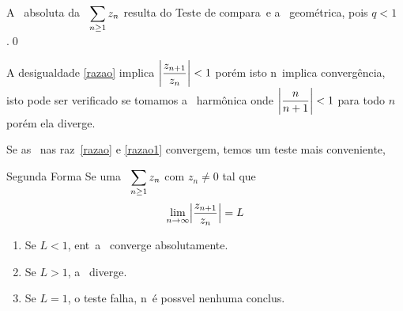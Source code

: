 A \conver\ absoluta da \ser\ $\displaystyle{\sum_{n\geq 1}z_n}$ resulta do
Teste de compara\cao\ e a \ser\ geom\'etrica, pois $q<1$.\qed

\begin{obs}
A desigualdade \eqref{razao} implica
$\displaystyle{\left|\frac{z_{n+1}}{z_n}\right|<1}$ por\'em isto n\ao\
implica converg\^encia, isto pode ser verificado se tomamos a
\ser\ harm\^onica onde $\displaystyle{\left|\frac{n}{n+1}\right|<1}$ para
todo $n$ por\'em ela diverge.
\end{obs}

Se as \seqs\ nas raz\oes\ \eqref{razao} e \eqref{razao1}
convergem, temos um teste mais conveniente,

\begin{theoc}{Segunda Forma}{}
Se uma \ser\ $\displaystyle{\sum_{n\geq 1}z_n}$ com $z_n\neq 0$ tal que
\begin{equation}\label{razao2}
  \lim_{n\to\infty} \Bigl|\frac{z_{n+1}}{z_n}\Bigr|=L
\end{equation}
\begin{enumerate}[label=\rm{(\alph*)},leftmargin=4em,ref=\rm{(\alph*)}]
  \item Se $L<1$, ent\ao\ a \ser\ converge absolutamente.
  \item Se $L>1$, a \ser\ diverge.
  \item Se $L=1$, o teste falha, n\ao\ \'e poss\ii vel nenhuma
  conclus\ao.
\end{enumerate}
\end{theoc}

